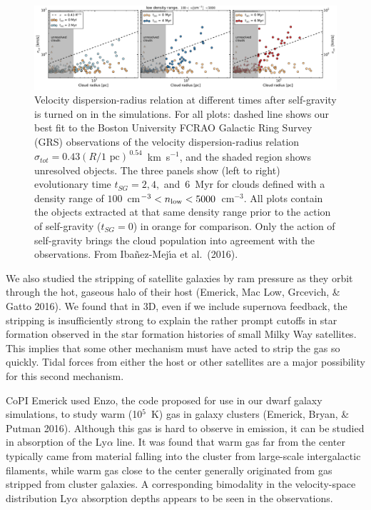 \documentclass[11pt,preprint]{article}
\begin{document}
\begin{figure} 
\includegraphics[width=1.0\textwidth]{Sigma-R_low.pdf}

\caption{Velocity dispersion-radius relation 
at different times after self-gravity is turned on in the simulations.
For all plots: dashed line shows our best fit to the Boston University FCRAO Galactic Ring Survey (GRS) observations of the velocity dispersion-radius relation $\sigma_{tot} =0.43 (R/\mbox{1 pc})^{\,0.54}$~km~s$^{-1}$, and the shaded region shows unresolved objects.
The three panels show (left to right) evolutionary time $t_{SG} = 2, 4,$ and~6~Myr for clouds defined with a density range of $100$~cm$^{-3} <  n_{\rm{low}}   < 5000$~cm$^{-3}$. All plots contain the objects extracted at that same density range prior to the action of self-gravity  ($t_{SG} = 0$) in orange for comparison.  Only the action of self-gravity brings the cloud population into agreement with the observations.
From Iba\~nez-Mej\'{\i}a et al.\ (2016).
\label{fig:sigma-L-evolution}
} 
\end{figure} 


We also studied the stripping of satellite galaxies by ram pressure as they orbit through the hot, gaseous halo of their host (Emerick, Mac Low, Grcevich, \& Gatto 2016). We found that in 3D, even if we include supernova feedback, the stripping is insufficiently strong to explain the rather prompt cutoffs in star formation observed in the star formation histories of small Milky Way satellites.  This implies that some other mechanism must have acted to strip the gas so quickly. Tidal forces from either the host or other satellites are a major possibility for this second mechanism.

CoPI Emerick used Enzo, the code proposed for use in our dwarf galaxy simulations, to study warm (10$^5$~K) gas in galaxy clusters (Emerick, Bryan, \& Putman 2016).  Although this gas is hard to observe in emission, it can be studied in absorption of the Ly$\alpha$ line.  It was found that warm gas far from the center typically came from material falling into the cluster from large-scale intergalactic filaments, while warm gas close to the center generally originated from gas stripped from cluster galaxies.  A corresponding bimodality in the velocity-space distribution Ly$\alpha$ absorption depths appears to be seen in the observations.
\end{document}

